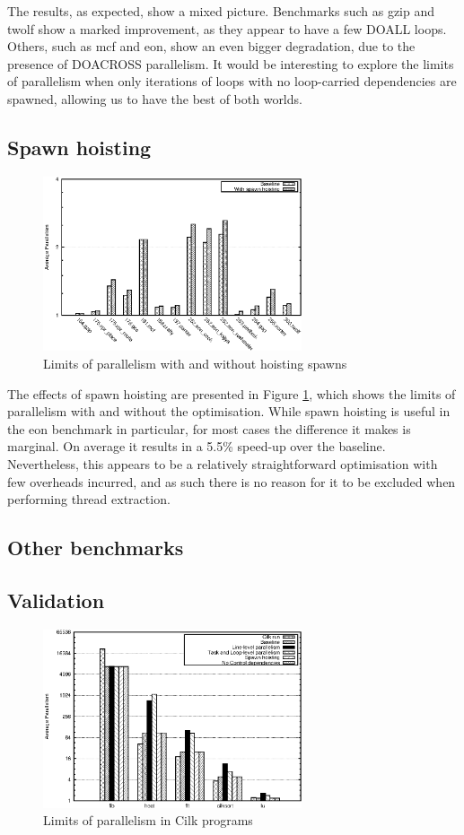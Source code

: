 The results, as expected, show a mixed picture.
Benchmarks such as gzip and twolf show a marked improvement, as they appear to have a few DOALL loops.
Others, such as mcf and eon, show an even bigger degradation, due to the presence of DOACROSS parallelism.
It would be interesting to explore the limits of parallelism when only iterations of loops with no loop-carried dependencies are spawned, allowing us to have the best of both worlds.

\subsection{Spawn hoisting}

\begin{figure}
 \centering
 \includegraphics[width=3in]{spec-hoist}
 \caption{Limits of parallelism with and without hoisting spawns}
 \label{spec-hoist}
\end{figure}

The effects of spawn hoisting are presented in Figure \ref{spec-hoist}, which shows the limits of parallelism with and without the optimisation.
While spawn hoisting is useful in the eon benchmark in particular, for most cases the difference it makes is marginal.
On average it results in a 5.5\% speed-up over the baseline.
Nevertheless, this appears to be a relatively straightforward optimisation with few overheads incurred, and as such there is no reason for it to be excluded when performing thread extraction.

\subsection{Other benchmarks}

\subsection{Validation}

\begin{figure}
 \centering
 \includegraphics[width=3in]{cilk}
 \caption{Limits of parallelism in Cilk programs}
 \label{cilk}
\end{figure}

